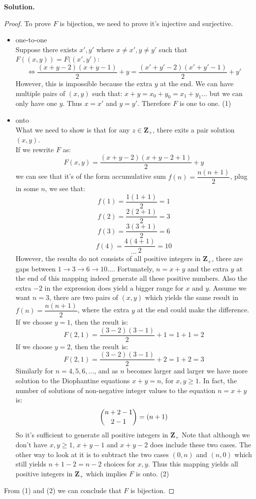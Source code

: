 \documentclass[10pt,letterpaper]{article}
\begin{document}
	\textbf{Solution.} \\
	\begin{proof} To prove $F$ is bijection, we need to prove it's injective and surjective. \\
	\begin{itemize}
		\item one-to-one \\
		Suppose there exists $x', y'$ where $x \neq x', y \neq y'$ such that $F((x, y)) = F((x',y')$:
		$$\Leftrightarrow \dfrac{(x + y - 2)(x + y - 1)}{2} + y = \dfrac{(x' + y' - 2)(x' + y' - 1)}{2} + y'$$
		However, this is impossible because the extra $y$ at the end. We can have multiple pairs of $(x, y)$ such that:
		$x + y = x_0 + y_0 = x_1 + y_1 \ldots$ but we can only have one $y$. Thus $x = x'$ and $y = y'$. Therefore
		$F$ is one to one. (1)
		\item onto \\
		What we need to show is that for any $z \in \mathbf{Z_{+}}$, there exits a pair solution $(x, y)$. \\
		If we rewrite $F$ as:
		$$F(x, y) = \dfrac{(x + y - 2)(x + y - 2 + 1)}{2} + y$$ 
		we can see that it's of the form accumulative sum $f(n) = \dfrac{n(n + 1)}{2}$, plug in some $n$, we see that:
		$$f(1) = \dfrac{1(1 + 1)}{2} = 1$$
		$$f(2) = \dfrac{2(2 + 1)}{2} = 3$$
		$$f(3) = \dfrac{3(3 + 1)}{2} = 6$$
		$$f(4) = \dfrac{4(4 + 1)}{2} = 10$$
		$$ \ldots $$	
		However, the results do not consists of all positive integers in $\mathbf{Z_{+}}$, there are gaps between
		$1 \rightarrow 3 \rightarrow 6 \rightarrow 10 \ldots$. Fortunately, $n = x + y$ and the extra $y$ at the end
		of this mapping indeed generate all these positive numbers. Also the extra $-2$ in the expression does yield
		a bigger range for $x$ and $y$. Assume we want $n = 3$, there are two pairs of $(x, y)$ which yields the same
		result in $f(n) = \dfrac{n(n + 1)}{2}$, where the extra $y$ at the end could make the difference. \\
		If we choose $y = 1$, then the result is:
		$$F(2, 1) = \dfrac{(3 - 2)(3 - 1)}{2} + 1 = 1 + 1 = 2$$
		If we choose $y = 2$, then the result is:
		$$F(2, 1) = \dfrac{(3 - 2)(3 - 1)}{2} + 2 = 1 + 2 = 3$$
		Similarly for $n = 4, 5, 6, \ldots$, and as $n$ becomes larger and larger we have more solution
		to the Diophantine equations $x + y = n$, for $x, y \geq 1$. In fact, the number of solutions of
		non-negative integer values to the equation $n = x + y$ is:
			$$\dbinom{n + 2 - 1}{2 - 1} = (n + 1)$$
		So it's sufficient to generate all positive integers in $\mathbf{Z_{+}}$
		Note that although we don't have $x, y \geq 1$, $x + y - 1$ and $x + y - 2$ does include
		these two cases. The other way to look at it is to subtract the two cases $(0, n)$ and $(n, 0)$
		which still yields $n + 1 - 2 = n - 2$ choices for $x, y$.
		Thus this mapping yields all positive integers in $\mathbf{Z_{+}}$ which implies
		$F$ is onto. (2)
	\end{itemize}
	From (1) and (2) we can conclude that $F$ is bijection.
	\end{proof}
	
\end{document}
